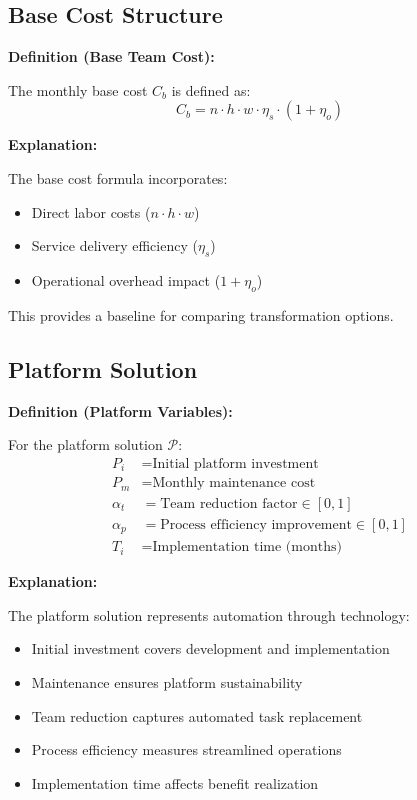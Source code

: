 \documentclass[12pt,a4paper]{article}
\newenvironment{definition}[1]
{\begin{mdframed}[style=definitionstyle]
\textbf{Definition (#1):}\par}
{\end{mdframed}}
\newenvironment{explanation}
{\begin{mdframed}[style=explanationstyle]
\textbf{Explanation:}\par}
{\end{mdframed}}
\begin{document}
\subsection{Base Cost Structure}
\begin{definition}{Base Team Cost}
The monthly base cost $C_b$ is defined as:
\begin{equation}
    C_b = n \cdot h \cdot w \cdot \eta_s \cdot (1 + \eta_o)
\end{equation}
\end{definition}

\begin{explanation}
The base cost formula incorporates:
\begin{itemize}
    \item Direct labor costs ($n \cdot h \cdot w$)
    \item Service delivery efficiency ($\eta_s$)
    \item Operational overhead impact ($1 + \eta_o$)
\end{itemize}
This provides a baseline for comparing transformation options.
\end{explanation}

\subsection{Platform Solution}
\begin{definition}{Platform Variables}
For the platform solution $\mathcal{P}$:
\begin{align*}
    P_i &= \text{Initial platform investment} \\
    P_m &= \text{Monthly maintenance cost} \\
    \alpha_t &= \text{Team reduction factor} \in [0,1] \\
    \alpha_p &= \text{Process efficiency improvement} \in [0,1] \\
    T_i &= \text{Implementation time (months)}
\end{align*}
\end{definition}

\begin{explanation}
The platform solution represents automation through technology:
\begin{itemize}
    \item Initial investment covers development and implementation
    \item Maintenance ensures platform sustainability
    \item Team reduction captures automated task replacement
    \item Process efficiency measures streamlined operations
    \item Implementation time affects benefit realization
\end{itemize}
\end{explanation}
\end{document}
